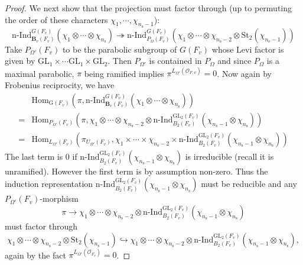 \documentclass[12pt,oneside,reqno]{amsart}
\theoremstyle{plain}
\begin{document}
\begin{proof}
		
		
		
		
		We next show that the projection must factor through (up to permuting the order of these characters $\chi_1,\cdots,\chi_{n_{\mathrm{s}}-1}$):
		\[
		\mathrm{n}\text{-}\mathrm{Ind}_{\mathbf{B}_v(F_v)}^{ G(F_v)}
		(\chi_1\otimes\cdots\otimes\chi_{n_{\mathrm{s}}})
		\twoheadrightarrow
		\mathrm{n}\text{-}\mathrm{Ind}_{P_{\Omega}(F_v)}^{ G(F_v)}
		(\chi_1\otimes\cdots\otimes\chi_{n_{\mathrm{s}}-2}
		\otimes
		\mathrm{St}_2(\chi_{n_{\mathrm{s}}-1}))
		\]
		Take $P_{\Omega'}(F_v)$ to be the parabolic subgroup of $ G(F_v)$
		whose Levi factor is given by $\mathrm{GL}_1\times\cdots\mathrm{GL}_1\times\mathrm{GL}_2$. Then
		$P_{\Omega'}$ is contained in $P_{\Omega}$ and since
		$P_{\Omega}$ is a maximal parabolic, $\pi$ being ramified implies
		$\pi^{L_{\Omega'}(\mathcal{O}_{F,v})}=0$. Now again by Frobenius reciprocity, we have
		\begin{align*}
			&
			\mathrm{Hom}_{\mathrm{G}(F_v)}
			(
			\pi,
			\mathrm{n}\text{-}\mathrm{Ind}_{\mathbf{B}_v(F_v)}^{ G(F_v)}
			(\chi_1\otimes\cdots\otimes\chi_{n_{\mathrm{s}}})
			)
			\\
			=
			&
			\mathrm{Hom}_{P_{\Omega'}(F_v)}
			(
			\pi,
			\chi_1\otimes\cdots\otimes\chi_{n_{\mathrm{s}}-2}
			\otimes
			\mathrm{n}\text{-}\mathrm{Ind}_{B_2(F_v)}^{\mathrm{GL}_2(F_v)}
			(\chi_{n_{\mathrm{s}}-1}\otimes\chi_{n_{\mathrm{s}}})
			)
			\\
			=
			&
			\mathrm{Hom}_{L_{\Omega'}(F_v)}
			(\pi_{U_{\Omega'}(F_v)},
			\chi_1\times\cdots\times\chi_{n_{\mathrm{s}}-2}
			\times
			\mathrm{n}\text{-}\mathrm{Ind}_{B_2(F_v)}^{\mathrm{GL}_2(F_v)}
			(\chi_{n_{\mathrm{s}}-1}\otimes\chi_{n_{\mathrm{s}}})
			)
		\end{align*}	
		The last term is $0$
		if
		$\mathrm{n}\text{-}\mathrm{Ind}_{B_2(F_v)}^{\mathrm{GL}_2(F_v)}
		(\chi_{n_{\mathrm{s}}-1}\otimes\chi_{n_{\mathrm{s}}})$
		is irreducible
		(recall it is unramified).
		However the first term is by assumption
		non-zero.
		Thus
		the induction
		representation
		$\mathrm{n}\text{-}\mathrm{Ind}_{B_2(F_v)}^{\mathrm{GL}_2(F_v)}
		(\chi_{n_{\mathrm{s}}-1}\otimes\chi_{n_{\mathrm{s}}})$
		must be reducible and
		any $P_{\Omega'}(F_v)$-morphism
		\[
		\pi
		\rightarrow
		\chi_1\otimes\cdots\otimes\chi_{n_{\mathrm{s}}-2}
		\otimes
		\mathrm{n}\text{-}\mathrm{Ind}_{B_2(F_v)}^{\mathrm{GL}_2(F_v)}
		(\chi_{n_{\mathrm{s}}-1}\otimes\chi_{n_{\mathrm{s}}})
		\]
		must factor through
		\[
		\chi_1\otimes\cdots\otimes\chi_{n_{\mathrm{s}}-2}
		\otimes
		\mathrm{St}_2(\chi_{n_{\mathrm{s}}-1})
		\hookrightarrow
		\chi_1\otimes\cdots\otimes\chi_{n_{\mathrm{s}}-2}
		\otimes
		\mathrm{n}\text{-}\mathrm{Ind}_{B_2(F_v)}^{\mathrm{GL}_2(F_v)}
		(\chi_{n_{\mathrm{s}}-1}\otimes\chi_{n_{\mathrm{s}}}),
		\]
		again by the fact
		$\pi^{L_{\Omega'}(\mathcal{O}_{F_v})}=0$.		
	\end{proof}
	
\end{document}
